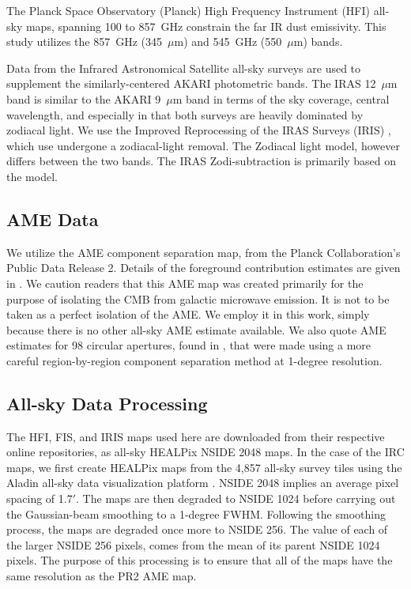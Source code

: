 \documentclass[preprint2,longabstract]{aastex}
\begin{document}
     The Planck Space Observatory (Planck) High Frequency Instrument (HFI) all-sky maps, spanning 100 to 857~GHz \citep{hfi14viii} constrain the far IR dust emissivity. This study utilizes the 857~GHz (345~$\mu$m) and 545~GHz (550~$\mu$m) bands.

     Data from the Infrared Astronomical Satellite \citep{iras84} all-sky surveys are used to supplement the similarly-centered AKARI photometric bands. The IRAS 12~$\mu$m band is similar to the AKARI 9~$\mu$m band in terms of the sky coverage, central wavelength, and especially in that both surveys are heavily dominated by zodiacal light. We use the Improved Reprocessing of the IRAS Surveys (IRIS) \citep{iris05}, which use undergone a zodiacal-light removal. The Zodiacal light model, however differs between the two bands. The IRAS Zodi-subtraction is primarily based on the \cite{kelsall98} model.

\subsection{AME Data}
     We utilize the AME component separation map, from the Planck Collaboration's Public Data Release 2. Details of the foreground contribution estimates are given in \cite{planckXII}. We caution readers that this AME map was created primarily for the purpose of isolating the CMB from galactic microwave emission. It is not to be taken as a perfect isolation of the AME. We employ it in this work, simply because there is no other all-sky AME estimate available. We also quote AME estimates for 98 circular apertures, found in \cite{planckXV}, that were made using a more careful region-by-region component separation method at 1-degree resolution.

\subsection{All-sky Data Processing}

      The HFI, FIS, and IRIS maps used here are downloaded from their respective online repositories, as all-sky HEALPix \citep{gorski15} NSIDE 2048 maps. In the case of the IRC maps, we first create HEALPix maps from the 4,857 all-sky survey tiles using the Aladin all-sky data visualization platform \citep{bonnarel00}. NSIDE 2048 implies an average pixel spacing of 1.7$'$. The maps are then degraded to NSIDE 1024 before carrying out the Gaussian-beam smoothing to a 1-degree FWHM. Following the smoothing process, the maps are degraded once more to NSIDE 256. The value of each of the larger NSIDE 256 pixels, comes from the mean of its parent NSIDE 1024 pixels. The purpose of this processing is to ensure that all of the maps have the same resolution as the PR2 AME map.
\end{document}
